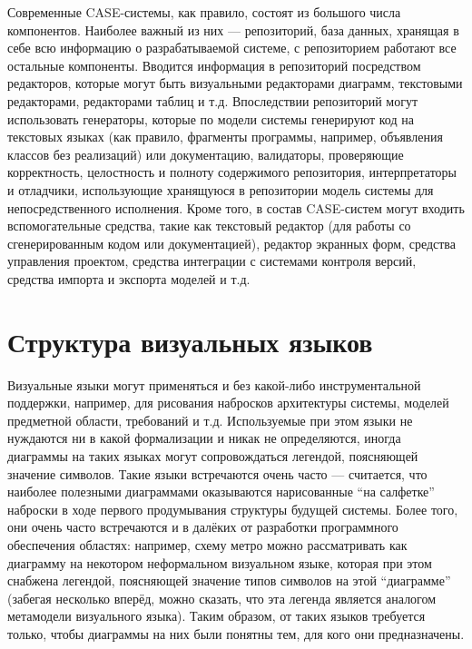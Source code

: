 Современные \ac{CASE}-системы, как правило, состоят из большого числа компонентов. 
Наиболее важный из них --- репозиторий, база данных, хранящая в себе всю 
информацию о разрабатываемой системе, с репозиторием работают все остальные 
компоненты. Вводится информация в репозиторий посредством редакторов, которые 
могут быть визуальными редакторами диаграмм, текстовыми редакторами, редакторами 
таблиц и т.д. Впоследствии репозиторий могут использовать генераторы, которые по 
модели системы генерируют код на текстовых языках (как правило, фрагменты 
программы, например, объявления классов без реализаций) или документацию, 
валидаторы, проверяющие корректность, целостность и полноту содержимого 
репозитория, интерпретаторы и отладчики, использующие хранящуюся в репозитории 
модель системы для непосредственного исполнения. Кроме того, в состав 
\ac{CASE}-систем могут входить вспомогательные средства, такие как текстовый редактор 
(для работы со сгенерированным кодом или документацией), редактор экранных форм, 
средства управления проектом, средства интеграции с системами контроля версий, 
средства импорта и экспорта моделей и т.д.

\section{Структура визуальных языков}
Визуальные языки могут применяться и без какой-либо инструментальной поддержки, 
например, для рисования набросков архитектуры системы, моделей предметной 
области, требований и т.д. Используемые при этом языки не нуждаются ни в какой 
формализации и никак не определяются, иногда диаграммы на таких языках могут 
сопровождаться легендой, поясняющей значение символов. Такие языки встречаются 
очень часто --- считается, что наиболее полезными диаграммами оказываются 
нарисованные "`на салфетке"' наброски в ходе первого продумывания структуры 
будущей системы. Более того, они очень часто встречаются и в далёких от 
разработки программного обеспечения областях: например, схему метро можно 
рассматривать как диаграмму на некотором неформальном визуальном языке, которая 
при этом снабжена легендой, поясняющей значение типов символов на этой 
"`диаграмме"' (забегая несколько вперёд, можно сказать, что эта легенда является 
аналогом метамодели визуального языка). Таким образом, от таких языков требуется 
только, чтобы диаграммы на них были понятны тем, для кого они предназначены.

